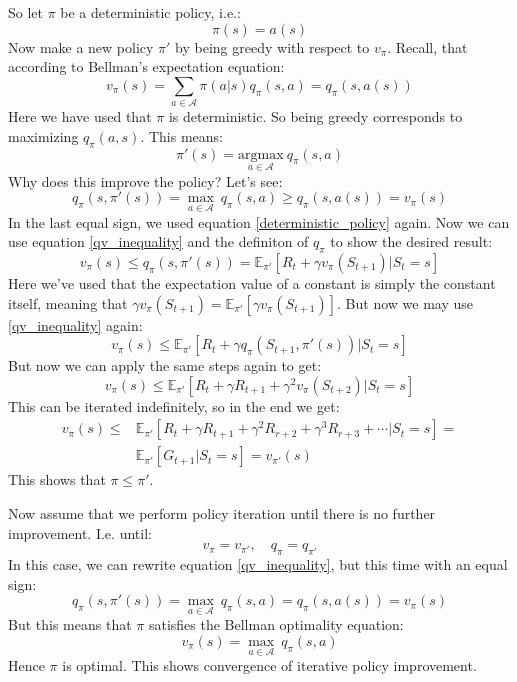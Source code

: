 \documentclass[12pt, a4paper]{article}
\numberwithin{equation}{section}
\begin{document}
So let $\pi$ be a deterministic policy, i.e.:
\begin{equation}
\pi(s)=a(s)
\end{equation}
Now make a new policy $\pi'$ by being greedy with respect to $v_\pi$. Recall, that according to Bellman's expectation equation:
\begin{equation}
v_\pi(s)=\sum_{a\in\mathcal{A}}\pi(a|s)q_\pi(s,a)=q_\pi(s,a(s))
\label{deterministic_policy}
\end{equation}
Here we have used that $\pi$ is deterministic. So being greedy corresponds to maximizing $q_\pi(a,s)$. This means:
\begin{equation}
\pi'(s)=\underset{a\in\mathcal{A}}{\textrm{argmax}}\ q_\pi(s,a)
\end{equation}
Why does this improve the policy? Let's see:
\begin{equation}
q_\pi(s,\pi'(s))=\underset{a\in\mathcal{A}}{\max}\ q_\pi(s,a)\ge q_\pi(s,a(s))=v_\pi(s)
\label{qv_inequality}
\end{equation}
In the last equal sign, we used equation \ref{deterministic_policy} again. Now we can use equation \ref{qv_inequality} and the definiton of $q_\pi$ to show the desired result:
\begin{equation}
v_\pi(s)\le q_\pi(s,\pi'(s))=\mathbb{E}_{\pi'}[R_t+\gamma v_\pi(S_{t+1})|S_t=s]
\end{equation}
Here we've used that the expectation value of a constant is simply the constant itself, meaning that $\gamma v_\pi(S_{t+1})=\mathbb{E}_{\pi'}[\gamma v_\pi(S_{t+1})]$. But now we may use \ref{qv_inequality} again:
\begin{equation}
v_\pi(s)\le\mathbb{E}_{\pi'}[R_t+\gamma q_\pi(S_{t+1},\pi'(s))|S_t=s]
\end{equation}
But now we can apply the same steps again to get:
\begin{equation}
v_\pi(s)\le\mathbb{E}_{\pi'}[R_t+\gamma R_{t+1}+\gamma^2 v_\pi(S_{t+2})|S_t=s]
\end{equation}
This can be iterated indefinitely, so in the end we get:
\begin{align}
v_\pi(s)\le&\mathbb{E}_{\pi'}[R_t+\gamma R_{t+1}+\gamma^2 R_{r+2}+\gamma^3 R_{r+3}+\cdots|S_t=s]=\\
&\mathbb{E}_{\pi'}[G_{t+1}|S_{t}=s]=v_{\pi'}(s)
\end{align}
This shows that $\pi\le\pi'$.

Now assume that we perform policy iteration until there is no further improvement. I.e. until:
\begin{equation}
v_\pi=v_{\pi'},\quad q_\pi=q_{\pi'}
\end{equation}
In this case, we can rewrite equation \ref{qv_inequality}, but this time with an equal sign:
\begin{equation}
q_\pi(s,\pi'(s))=\underset{a\in\mathcal{A}}{\max}\ q_\pi(s,a)=q_\pi(s,a(s))=v_\pi(s)
\end{equation}
But this means that $\pi$ satisfies the Bellman optimality equation:
\begin{equation}
v_\pi(s)=\underset{a\in\mathcal{A}}{\max}\ q_\pi(s,a)
\end{equation}
Hence $\pi$ is optimal. This shows convergence of iterative policy improvement.
\end{document}
